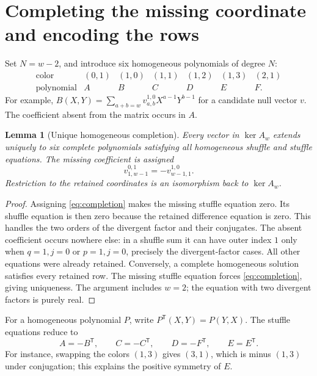 \documentclass[11pt,a4paper]{article}
\numberwithin{equation}{section}
\newtheorem{lemma}[theorem]{Lemma}
\theoremstyle{definition}\newtheorem{definition}[theorem]{Definition}
\theoremstyle{remark}\newtheorem{remark}[theorem]{Remark}
\newcommand{\rev}{\mathsf T}
\begin{document}
\section{Completing the missing coordinate and encoding the rows}
\label{sec:polys}
Set $N=w-2$, and introduce six homogeneous polynomials of degree $N$:
\begin{equation}
\begin{array}{c|cccccc}
\text{color}&(0,1)&(1,0)&(1,1)&(1,2)&(1,3)&(2,1)\\ \hline
\text{polynomial}&A&B&C&D&E&F.
\end{array}
\label{eq:poly-names}
\end{equation}
For example,
$B(X,Y)=\sum_{a+b=w}v_{a,b}^{1,0}X^{a-1}Y^{b-1}$ for a candidate null vector
$v$. The coefficient absent from the matrix occurs in $A$.

\begin{lemma}[Unique homogeneous completion]\label{lem:completion}
Every vector in $\ker A_w$ extends uniquely to six complete polynomials
satisfying all homogeneous shuffle and stuffle equations. The missing
coefficient is assigned
\begin{equation}
v_{1,w-1}^{0,1}=-v_{w-1,1}^{1,0}.
\label{eq:completion}
\end{equation}
Restriction to the retained coordinates is an isomorphism back to $\ker A_w$.
\end{lemma}
\begin{proof}
Assigning \eqref{eq:completion} makes the missing stuffle equation zero.
Its shuffle equation is then zero because the retained difference equation
is zero. This handles the two orders of the divergent factor and their
conjugates. The absent coefficient occurs nowhere else: in a shuffle sum it
can have outer index $1$ only when $q=1,j=0$ or $p=1,j=0$, precisely the
divergent-factor cases. All other equations were already retained. Conversely,
a complete homogeneous solution satisfies every retained row. The missing
stuffle equation forces \eqref{eq:completion}, giving uniqueness. The argument
includes $w=2$; the equation with two divergent factors is purely real.
\end{proof}

For a homogeneous polynomial $P$, write $P^\rev(X,Y)=P(Y,X)$. The stuffle
equations reduce to
\begin{equation}
A=-B^\rev,\qquad C=-C^\rev,\qquad
D=-F^\rev,\qquad E=E^\rev.
\label{eq:stuff-polys}
\end{equation}
For instance, swapping the colors $(1,3)$ gives $(3,1)$, which is minus
$(1,3)$ under conjugation; this explains the positive symmetry of $E$.
\end{document}
